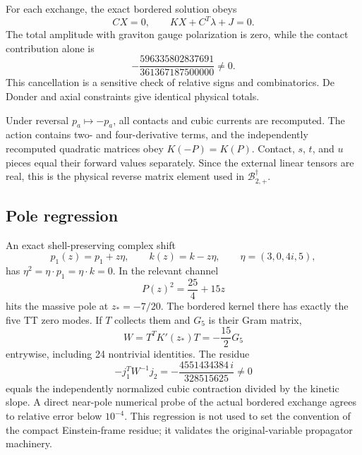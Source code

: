 \documentclass[11pt]{article}
\theoremstyle{definition}
\theoremstyle{remark}
\newcommand{\dg}{\dagger}
\newcommand{\Born}{\mathcal B}
\begin{document}
For each exchange, the exact bordered solution obeys
\begin{equation}
CX=0,
\qquad
KX+C^T\lambda+J=0.
\end{equation}
The total amplitude with graviton gauge polarization is zero, while the
contact contribution alone is
\begin{equation}
-\frac{596335802837691}{361367187500000}\ne0.
\end{equation}
This cancellation is a sensitive check of relative signs and
combinatorics.  De Donder and axial constraints give identical physical
totals.

Under reversal $p_a\mapsto-p_a$, all contacts and cubic currents are
recomputed.  The action contains two- and four-derivative terms, and the
independently recomputed quadratic matrices obey $K(-P)=K(P)$.  Contact,
$s$, $t$, and $u$ pieces equal their forward values separately.  Since
the external linear tensors are real, this is the physical reverse
matrix element used in $\Born_{2,+}^{\dg}$.

\subsection{Pole regression}

An exact shell-preserving complex shift
\begin{equation}
p_1(z)=p_1+z\eta,\qquad k(z)=k-z\eta,
\qquad \eta=(3,0,4i,5),
\end{equation}
has $\eta^2=\eta\cdot p_1=\eta\cdot k=0$.  In the relevant channel
\begin{equation}
P(z)^2=\frac{25}{4}+15z
\end{equation}
hits the massive pole at $z_*=-7/20$.  The bordered kernel there has
exactly the five TT zero modes.  If $T$ collects them and $G_5$ is their
Gram matrix,
\begin{equation}
W=T^TK'(z_*)T=-\frac{15}{2}G_5
\end{equation}
entrywise, including 24 nontrivial identities.  The residue
\begin{equation}
-j_1^TW^{-1}j_2=-\frac{4551434384\,i}{328515625}\ne0
\end{equation}
equals the independently normalized cubic contraction divided by the
kinetic slope.  A direct near-pole numerical probe of the actual bordered
exchange agrees to relative error below $10^{-4}$.  This regression is
not used to set the convention of the compact Einstein-frame residue;
it validates the original-variable propagator machinery.
\end{document}
